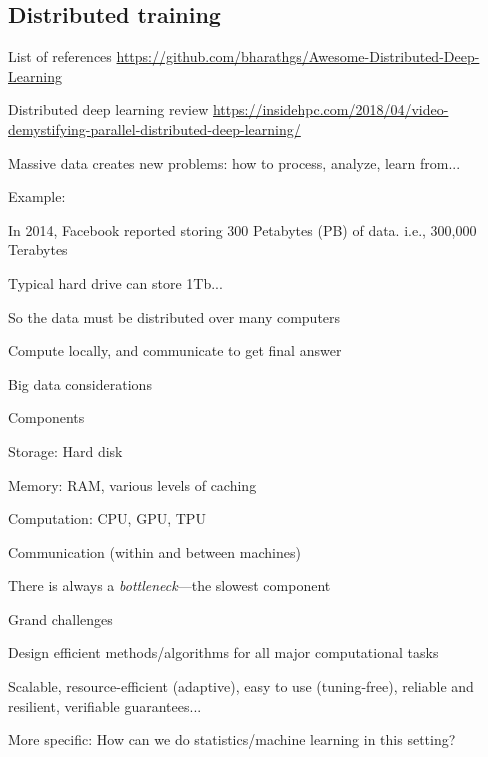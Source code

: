 \documentclass[english]{article}
\begin{document}
\eitem 



\subsection{Distributed training}


\benum 
\item List of references \url{https://github.com/bharathgs/Awesome-Distributed-Deep-Learning}


Distributed deep learning review \url{https://insidehpc.com/2018/04/video-demystifying-parallel-distributed-deep-learning/}


\item Massive data creates new problems: how to process, analyze, learn from...
\item Example: 
\bitem
\item In 2014, Facebook reported storing 300 Petabytes (PB) of data. i.e., 300,000 Terabytes
\item Typical hard drive can store 1Tb...
\item So the data must be distributed over many computers
\item Compute locally, and communicate to get final answer
\eitem



\item {Big data considerations}
\bitem
\item Components
\bitem
\item Storage: Hard disk 
\item Memory: RAM, various levels of caching
\item Computation: CPU, GPU, TPU
\item Communication (within and between machines)
\eitem
\item There is always a \emph{bottleneck}---the slowest component
\eitem




\item {Grand challenges}
\bitem
\item Design efficient methods/algorithms for all major computational tasks
\item Scalable, resource-efficient (adaptive), easy to use (tuning-free), reliable and resilient, verifiable guarantees...
\item More specific: How can we do statistics/machine learning in this setting? 
\eitem
\end{document}
